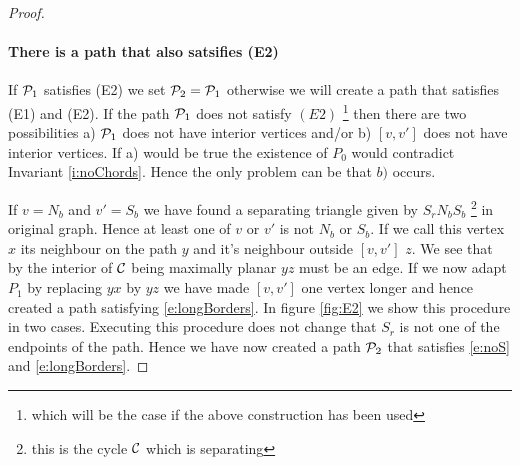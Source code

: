 \begin{proof}
\paragraph{There is a path that also satsifies (E2)}
If $\P_1$ satisfies (E2) we set $\P_2 = \P_1$ otherwise we will create a path that satisfies (E1) and (E2).
If the path $\P_1$ does not satisfy $(E2)$ \footnote{which will be the case if the above construction has been used} then there are two possibilities  a) $\P_1$ does not have interior vertices and/or b) $[v,v']$ does not have interior vertices. If a) would be true the existence of $P_0$ would contradict Invariant \ref{i:noChords}. Hence the only problem can be that $b)$ occurs.

If $v=N_b$ and $v'=S_b$ we have found a separating triangle given by $S_rN_bS_b$ \footnote{this is the cycle $\C$ which is separating} in original graph. Hence at least one of $v$ or $v'$ is not $N_b$ or $S_b$. If we call this vertex $x$ its neighbour on the path $y$ and it's neighbour outside $[v,v']$ $z$. We see that by the interior of $\C$ being maximally planar $yz$ must be an edge. If we now adapt $P_1$ by replacing $yx$ by $yz$ we have made $[v,v']$ one vertex longer and hence created a path satisfying \ref{e:longBorders}. In figure \ref{fig:E2} we show this procedure in two cases. Executing this procedure does not change that $S_r$ is not one of the endpoints of the path. Hence we have now created a path $\P_2$ that satisfies \ref{e:noS} and \ref{e:longBorders}.


\end{proof}
